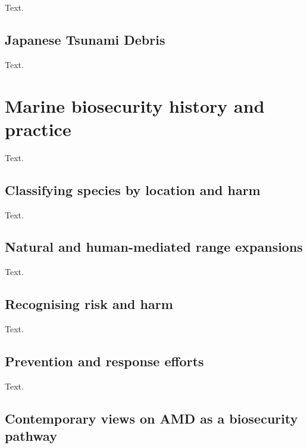 \documentclass[a4paper, nobind]{templates/ociamthesis}
\begin{document}
Text.

\hypertarget{japanese-tsunami-debris}{%
\subsection{Japanese Tsunami Debris}\label{japanese-tsunami-debris}}

Text.

\hypertarget{marine-biosecurity-history-and-practice}{%
\section{Marine biosecurity history and practice}\label{marine-biosecurity-history-and-practice}}

Text.

\hypertarget{classifying-species-by-location-and-harm}{%
\subsection{Classifying species by location and harm}\label{classifying-species-by-location-and-harm}}

Text.

\hypertarget{natural-and-human-mediated-range-expansions}{%
\subsection{Natural and human-mediated range expansions}\label{natural-and-human-mediated-range-expansions}}

Text.

\hypertarget{recognising-risk-and-harm}{%
\subsection{Recognising risk and harm}\label{recognising-risk-and-harm}}

Text.

\hypertarget{prevention-and-response-efforts}{%
\subsection{Prevention and response efforts}\label{prevention-and-response-efforts}}

Text.

\hypertarget{contemporary-views-on-amd-as-a-biosecurity-pathway}{%
\subsection{Contemporary views on AMD as a biosecurity pathway}\label{contemporary-views-on-amd-as-a-biosecurity-pathway}}
\end{document}

